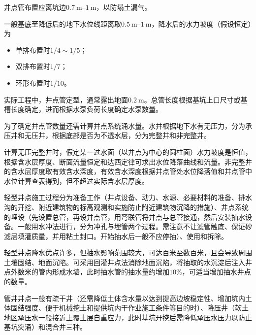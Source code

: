 \documentclass{book}
\begin{document}
\par 井点管布置应离坑边$\SIrange{0.7}{1}{\m}$，以防塌土漏气。
\par 一般基底至降低后的地下水位线距离取$\SIrange{0.5}{1}{\m}$，降水后的水力坡度（假设恒定）为
\begin{itemize}
    \item 单排布置时$1/4\sim1/5$；
    \item 双排布置时$1/7$；
    \item 环形布置时$1/10$。
\end{itemize}
\par 实际工程中，井点管定型，通常露出地面$\SI{0.2}{\m}$。总管长度根据基坑上口尺寸或基槽长度确定，进而根据水泵负荷长度确定水泵数量。
\par 为了确定井点管数量还需计算井点系统涌水量。水井根据地下水有无压力，分为承压井和无压井，根据底部是否为不透水层，分为完整井和非完整井。
\par 计算无压完整井时，假定某一过水面（以井点为中心的圆柱面）水力坡度是恒值，根据含水层厚度、断面流量恒定和达西定律可求出水位降落曲线和流量。非完整井的含水层厚度取有效含水深度，有效含水深度根据井点管处水位降落值和井点管中水位计算查表得到，但不超过实际含水层厚度。
\par 轻型井点施工过程分为准备工作（井点设备、动力、水源、必要材料的准备、排水沟的开挖、附近建筑物的标高观测和实施防止附近建筑物沉降的措施）、井点系统的埋设（先设置总管，再设井点管，用弯联管将井点与总管接通，然后安装抽水设备。一般用水冲法进行，分为冲孔与埋管两个过程。需注意不让滤管触底、保证砂滤层填灌质量，并用粘土封口。开始抽水后一般不应停抽）、使用和拆除。
\par 轻型井点降水优点许多，但抽水影响范围较大，可达百米至数百米，且会导致周围土壤固结、地面沉陷。可采用回灌井点法消除地面沉陷，将抽取的水沉淀后注入井点外数米的管内形成水墙，此时抽水管的抽水量约增加$10\%$，可适当增加抽水井点的数量。
\par 管井井点一般有疏干井（还需降低土体含水量以达到提高边坡稳定性、增加坑内土体固结强度、便于机械挖土和提供坑内干作业施工条件等目的时）、降压井（软土地区承压水一般接近上覆土层自重应力，此时基坑开挖后需降低承压水压力以防止基坑突涌）和混合井三种。
\end{document}
